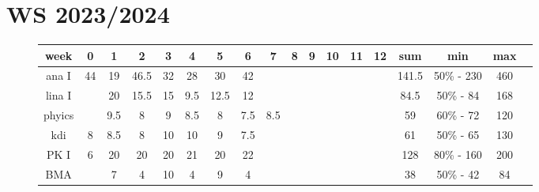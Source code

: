 \documentclass{gadsescript}
\begin{document}
\maketitle
\section{WS 2023/2024}
\begin{figure}[H]
	\begin{tabular}{|c|c|c|c|c|c|c|c|c|c|c|c|c|c|c|c|c|c|}
		\hline
		week	& 0	& 1	& 2	& 3	& 4	& 5	& 6	& 7	& 8	& 9	& 10	& 11	& 12	& sum	& min		& max	\\\hline
		ana I	& 44	& 19	& 46.5	& 32	& 28	& 30	& 42	& 	& 	& 	& 	& 	& 	& 141.5	& 50\% - 230	& 460	\\
		lina I	&  	& 20	& 15.5	& 15	& 9.5	& 12.5	& 12	& 	& 	& 	& 	& 	& 	& 84.5	& 50\% - 84	& 168	\\
		phyics	&	& 9.5	& 8	& 9	& 8.5	& 8	& 7.5 	& 8.5	& 	& 	& 	& 	& 	& 59	& 60\% - 72	& 120	\\
		kdi	& 8	& 8.5	& 8	& 10	& 10	& 9	& 7.5	& 	& 	& 	& 	& 	& 	& 61	& 50\% - 65	& 130	\\
		PK I	& 6	& 20	& 20	& 20	& 21	& 20	& 22	& 	& 	& 	& 	& 	& 	& 128	& 80\% - 160	& 200	\\
		BMA	& 	& 7	& 4	& 10	& 4	& 9	& 4	& 	& 	& 	& 	& 	& 	& 38	& 50\% - 42	& 84	\\
		\hline
	\end{tabular}
\end{figure}
\end{document}
